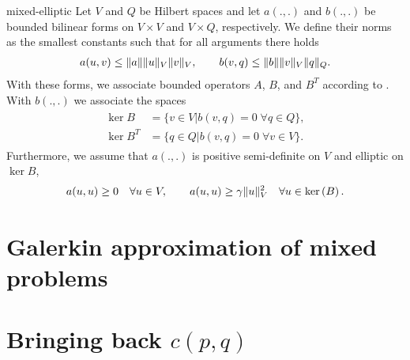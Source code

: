 \begin{Assumption}{mixed-elliptic}
  Let $V$ and $Q$ be Hilbert spaces and let $a(.,.)$ and $b(.,.)$ be
  bounded bilinear forms on $V\times V$ and $V\times Q$,
  respectively. We define their norms as the smallest constants such
  that for all arguments there holds
  \begin{gather}
    a(u,v) \le \lVert a\rVert \lVert u\rVert_V \lVert v\rVert_V,
    \qquad
    b(v,q) \le \lVert b\rVert \lVert v\rVert_V \lVert q\rVert_Q.
  \end{gather}
  With these forms, we associate bounded operators $A$, $B$, and $B^T$
  according to . With
  $b(.,.)$ we associate the spaces
  \begin{gather}
    \begin{split}
      \ker B &= \bigl\{v\in V \big| b(v,q) = 0 \;\forall q\in Q\bigr\},\\
      \ker B^T &= \bigl\{q\in Q \big| b(v,q) = 0 \;\forall v\in V\bigr\}.
    \end{split}
  \end{gather}
  Furthermore, we assume that $a(.,.)$ is positive semi-definite on
  $V$ and elliptic on $\ker B$,
  \begin{gather}
    a(u,u) \ge 0 \quad\forall u\in V,
    \qquad
    a(u,u) \ge \gamma \lVert u\rVert_V^2 \quad\forall u\in \operatorname{ker}\left(B\right).
  \end{gather}
\end{Assumption}

\section{Galerkin approximation of mixed problems}



\section{Bringing back $c(p,q)$}

